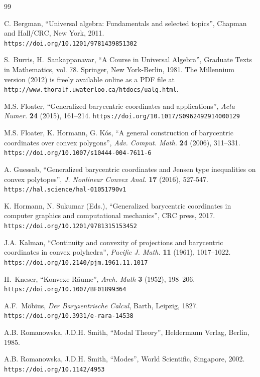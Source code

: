 \documentclass[12pt]{amsart}
\theoremstyle{plain}
\theoremstyle{definition}
\numberwithin{equation}{section}
\begin{document}
\begin{thebibliography}{99}

C. Bergman,
``{Universal algebra: Fundamentals and selected topics}'',
Chapman and Hall/CRC, New York, 2011.\\
\texttt{https://doi.org/10.1201/9781439851302}

S.~Burris, H.~Sankappanavar, ``{A Course in Universal Algebra}'', Graduate Texts
 in Mathematics, vol. 78. Springer, New York-Berlin, 1981. The Millennium version (2012) is freely available online as a PDF file at
 \texttt{http://www.thoralf.uwaterloo.ca/htdocs/ualg.html}.

M.S. Floater,
``{Generalized barycentric coordinates and applications}'',
\textit{Acta Numer.} \textbf{24} (2015), 161--214.
\texttt{https://doi.org/10.1017/S0962492914000129}

M.S. Floater, K. Hormann, G. K\'{o}s, ``{A general construction
 of barycentric coordinates over convex polygons}'', \textit{Adv. Comput. Math.}
 \textbf{24} (2006), 311–331.
\texttt{https://doi.org/10.1007/s10444-004-7611-6}

A. Guessab, ``{Generalized barycentric coordinates and Jensen type inequalities on convex polytopes}'', \textit{J. Nonlinear Convex Anal.}
 \textbf{17} (2016), 527-547.
\texttt{https://hal.science/hal-01051790v1}

K. Hormann, N. Sukumar (Eds.), ``{Generalized barycentric coordinates in computer graphics and computational mechanics}'', CRC press, 2017.
\texttt{https://doi.org/10.1201/9781315153452}

 J.A. Kalman, ``{Continuity and convexity of projections and barycentric coordinates in convex
 polyhedra}'', \textit{Pacific J. Math.} \textbf{11} (1961), 1017–1022.
\texttt{https://doi.org/10.2140/pjm.1961.11.1017}

H.~Kneser, ``{Konvexe R\"{a}ume}'', \textit{Arch. Math} \textbf{3} (1952), 198--206.\\
\texttt{https://doi.org/10.1007/BF01899364}

A.F.~M\"obius,
\textit{Der Baryzentrische Calcul},
Barth, Leipzig, 1827.
\texttt{https://doi.org/10.3931/e-rara-14538}

A.B. Romanowska, J.D.H. Smith,
``{Modal Theory}'',
Heldermann Verlag, Berlin, 1985.

A.B. Romanowska, J.D.H. Smith,
``{Modes}'',
World Scientific, Singapore, 2002.\\
\texttt{https://doi.org/10.1142/4953}


\end{thebibliography}
\end{document}
